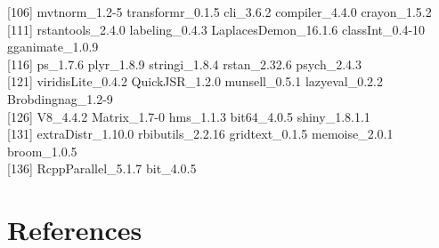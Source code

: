 \documentclass[preprint]{JASA}
\begin{document}
{[}106{]} mvtnorm\_1.2-5 transformr\_0.1.5 cli\_3.6.2 compiler\_4.4.0 crayon\_1.5.2\\
{[}111{]} rstantools\_2.4.0 labeling\_0.4.3 LaplacesDemon\_16.1.6 classInt\_0.4-10 gganimate\_1.0.9\\
{[}116{]} ps\_1.7.6 plyr\_1.8.9 stringi\_1.8.4 rstan\_2.32.6 psych\_2.4.3\\
{[}121{]} viridisLite\_0.4.2 QuickJSR\_1.2.0 munsell\_0.5.1 lazyeval\_0.2.2 Brobdingnag\_1.2-9\\
{[}126{]} V8\_4.4.2 Matrix\_1.7-0 hms\_1.1.3 bit64\_4.0.5 shiny\_1.8.1.1\\
{[}131{]} extraDistr\_1.10.0 rbibutils\_2.2.16 gridtext\_0.1.5 memoise\_2.0.1 broom\_1.0.5\\
{[}136{]} RcppParallel\_5.1.7 bit\_4.0.5

\newpage{}

\section{References}\label{sec:references}

\begingroup
\setlength{\parindent}{-0.5in}
\setlength{\leftskip}{0.5in}

\nocite{barreda-nearey2018}
\nocite{goldinger1996}
\nocite{hay2017}
\nocite{hay2019}
\nocite{johnson1999}
\nocite{kleinschmidt-jaeger2016}
\nocite{mcgowan2015}
\nocite{shannon1948}
\nocite{sumner2011}
\nocite{walker-hay2011}

\endgroup









\end{document}
